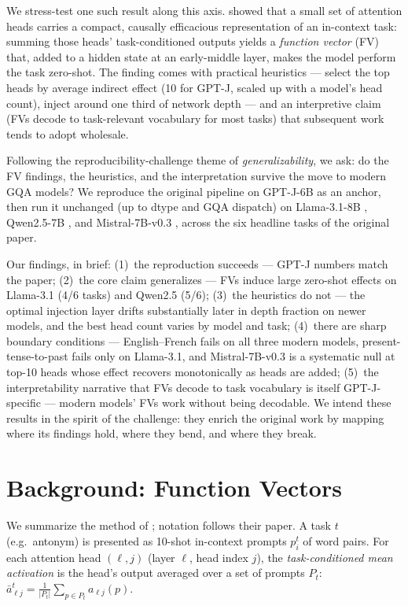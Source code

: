 \documentclass[11pt]{article}
\begin{document}
We stress-test one such result along this axis. \citet{todd2024function}
showed that a small set of attention heads carries a compact, causally
efficacious representation of an in-context task: summing those heads'
task-conditioned outputs yields a \emph{function vector} (FV) that, added to
a hidden state at an early-middle layer, makes the model perform the task
zero-shot. The finding comes with practical heuristics --- select the top
heads by average indirect effect (10 for GPT-J, scaled up with a model's
head count), inject around one third of network depth --- and an
interpretive claim (FVs decode to task-relevant vocabulary for most tasks)
that subsequent work tends to adopt wholesale.

Following the reproducibility-challenge theme of \emph{generalizability}, we
ask: do the FV findings, the heuristics, and the interpretation survive the
move to modern GQA models? We reproduce the original pipeline on GPT-J-6B
\citep{wang2021gptj} as an anchor, then run it unchanged (up to dtype and
GQA dispatch) on Llama-3.1-8B \citep{grattafiori2024llama3}, Qwen2.5-7B
\citep{qwen2025qwen25}, and Mistral-7B-v0.3 \citep{jiang2023mistral}, across
the six headline tasks of the original paper.

Our findings, in brief: (1)~the reproduction succeeds --- GPT-J numbers
match the paper; (2)~the core claim generalizes --- FVs induce large
zero-shot effects on Llama-3.1 (4/6 tasks) and Qwen2.5 (5/6); (3)~the
heuristics do not --- the optimal injection layer drifts substantially later
in depth fraction on newer models, and the best head count varies by model
and task; (4)~there are sharp boundary conditions --- English--French fails
on all three modern models, present-tense-to-past fails only on Llama-3.1,
and Mistral-7B-v0.3 is a systematic null at top-10 heads whose effect
recovers monotonically as heads are added; (5)~the interpretability
narrative that FVs decode to task vocabulary is itself GPT-J-specific ---
modern models' FVs work without being decodable. We intend these results in
the spirit of the challenge: they enrich the original work by mapping where
its findings hold, where they bend, and where they break.

\section{Background: Function Vectors}

We summarize the method of \citet{todd2024function}; notation follows their
paper. A task $t$ (e.g.\ antonym) is presented as 10-shot in-context prompts
$p^t_i$ of word pairs. For each attention head $(\ell, j)$ (layer $\ell$,
head index $j$), the \emph{task-conditioned mean activation} is the head's
output averaged over a set of prompts $P_t$:
$\bar{a}^t_{\ell j} = \tfrac{1}{|P_t|}\sum_{p \in P_t} a_{\ell j}(p)$.
\end{document}
